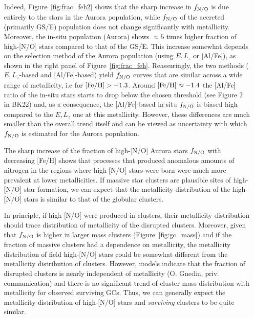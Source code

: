 \documentclass[a4paper,useAMS,usenatbib]{mnras}
\begin{document}
Indeed, Figure~\ref{fig:frac_feh2} shows that the sharp increase in $f_{\rm N/O}$ is due entirely to the stars in the Aurora population, while $f_{\rm N/O}$ of the accreted (primarily GS/E) population does not change significantly with metallicity. Moreover, the in-situ population (Aurora) shows $\approx 5$ times higher fraction of high-[N/O] stars compared to that of the GS/E. This increase somewhat depends on the selection method of the Aurora population (using $E,L_z$ or [Al/Fe]), as shown in the right panel of Figure~\ref{fig:frac_feh}.  Reassuringly, the two methods ($E, L_z$-based and [Al/Fe]-based) yield $f_{\rm N/O}$ curves that are similar across a wide range of metallicity, i.e for $\rm [Fe/H]>-1.3$. Around $\rm [Fe/H]\approx-1.4$ the [Al/Fe] ratio of the in-situ stars starts to drop below the chosen threshold (see Figure 2 in BK22) and, as a consequence, the [Al/Fe]-based in-situ $f_{\rm N/O}$ is biased high compared to the $E,L_z$ one at this metallicity. However, these differences are much smaller than the overall trend itself and can be viewed as uncertainty with which $f_{\rm N/O}$ is estimated for the Aurora population. 

The sharp increase of the fraction of high-[N/O] Aurora stars $f_{\rm N/O}$ with decreasing [Fe/H] shows that processes that produced anomalous amounts of nitrogen in the regions where high-[N/O] stars were born were much more prevalent at lower metallicities. If massive star clusters are plausible sites of high-[N/O] star formation, we can expect that the metallicity distribution of the high-[N/O] stars is similar to that of the globular clusters. 

In principle, if high-[N/O] were produced in clusters, their metallicity distribution should trace distribution of metallicity of the disrupted clusters. Moreover, given that $f_{\rm N/O}$ is higher in larger mass clusters (Figure~\ref{fig:gc_mass}) and if the fraction of massive clusters had a dependence on metallicity, the metallicity distribution of field high-[N/O] stars could be somewhat different from the metallicity distribution of clusters. However, models indicate that the fraction of disrupted clusters is nearly independent of metallicity (O. Gnedin, priv. communication) and there is no significant trend of cluster mass distribution with metallicity for observed surviving GCs. Thus, we can generally expect the metallicity distribution of high-[N/O] stars and {\it surviving} clusters to be quite similar. 
\end{document}
